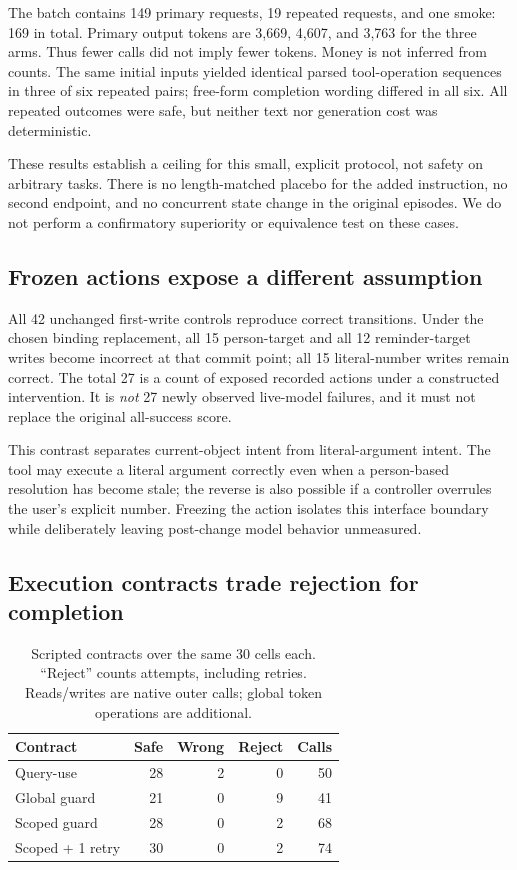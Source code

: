 \documentclass[10pt,letterpaper]{article}
\begin{document}
The batch contains 149 primary requests, 19 repeated requests, and one smoke: 169 in total. Primary output tokens are 3,669, 4,607, and 3,763 for the three arms. Thus fewer calls did not imply fewer tokens. Money is not inferred from counts. The same initial inputs yielded identical parsed tool-operation sequences in three of six repeated pairs; free-form completion wording differed in all six. All repeated outcomes were safe, but neither text nor generation cost was deterministic.

These results establish a ceiling for this small, explicit protocol, not safety on arbitrary tasks. There is no length-matched placebo for the added instruction, no second endpoint, and no concurrent state change in the original episodes. We do not perform a confirmatory superiority or equivalence test on these cases.

\subsection{Frozen actions expose a different assumption}
All 42 unchanged first-write controls reproduce correct transitions. Under the chosen binding replacement, all 15 person-target and all 12 reminder-target writes become incorrect at that commit point; all 15 literal-number writes remain correct. The total 27 is a count of exposed recorded actions under a constructed intervention. It is \emph{not} 27 newly observed live-model failures, and it must not replace the original all-success score.

This contrast separates current-object intent from literal-argument intent. The tool may execute a literal argument correctly even when a person-based resolution has become stale; the reverse is also possible if a controller overrules the user's explicit number. Freezing the action isolates this interface boundary while deliberately leaving post-change model behavior unmeasured.

\subsection{Execution contracts trade rejection for completion}
\begin{table}[t]
\centering\small
\caption{Scripted contracts over the same 30 cells each. ``Reject'' counts attempts, including retries. Reads/writes are native outer calls; global token operations are additional.}\label{tab:contracts}
\begin{tabular}{lrrrr}
\toprule
Contract & Safe & Wrong & Reject & Calls\\
\midrule
Query-use &28&2&0&50\\
Global guard &21&0&9&41\\
Scoped guard &28&0&2&68\\
Scoped + 1 retry &30&0&2&74\\
\bottomrule
\end{tabular}
\end{table}
\end{document}

